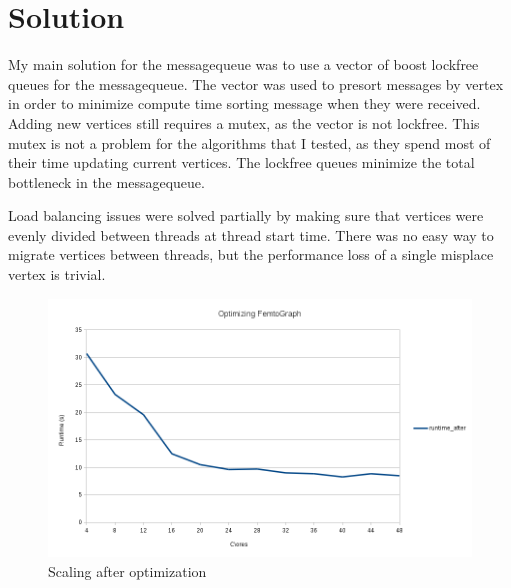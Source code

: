 \documentclass{sig-alternate-05-2015}
\begin{document}
\section{Solution}
\justify
My main solution for the messagequeue was to use a vector of boost lockfree queues for the messagequeue. The vector was used to presort messages by vertex in order to minimize compute time sorting message when they were received. Adding new vertices still requires a mutex, as the vector is not lockfree. This mutex is not a problem for the algorithms that I tested, as they spend most of their time updating current vertices. The lockfree queues minimize the total bottleneck in the messagequeue.

Load balancing issues were solved partially by making sure that vertices were evenly divided between threads at thread start time. There was no easy way to migrate vertices between threads, but the performance loss of a single misplace vertex is trivial.  

\begin{figure}
  \centering
  \includegraphics[width=\columnwidth]{after.png}
  \caption{Scaling after optimization}
\end{figure}
\end{document}
